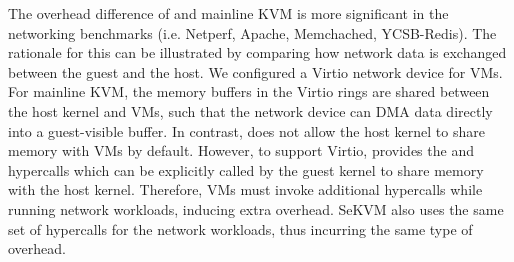 The overhead difference of \rustsec{} and mainline KVM is more significant in
the networking benchmarks (i.e. Netperf, Apache, Memchached, YCSB-Redis).
The rationale for this can be illustrated by comparing how network data is
exchanged between the guest and the host.
We configured a Virtio network device for VMs. For mainline KVM, the memory
buffers in the Virtio rings are shared between the host kernel and VMs, such
that the network device can DMA data directly into a guest-visible buffer.
In contrast, \rustsec{} does not allow the host kernel to share memory with VMs
by default. However, to support Virtio, \rustsec{} provides the
 and  hypercalls which can be explicitly
called by the guest kernel to share memory with the host kernel.
Therefore, \rustsec{} VMs must invoke additional hypercalls while running
network workloads, inducing extra overhead. SeKVM also uses the same set of
hypercalls for the network workloads, thus incurring the same type of overhead.



